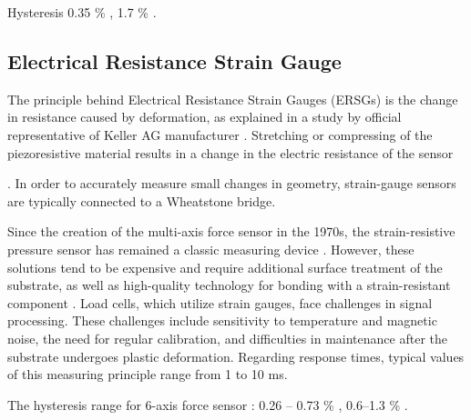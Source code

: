 Hysteresis 0.35 \% \cite{pressure_capac_hysteresis}, 1.7 \% \cite{pressure_capac_hysteresis_2}.

\subsection{Electrical Resistance Strain Gauge}
The principle behind Electrical Resistance Strain Gauges (ERSGs) is the change in resistance caused 
by deformation, as explained in a study by official representative of Keller AG manufacturer \cite{keller_article}. 
Stretching or compressing of the piezoresistive material results in a change in the electric resistance of the sensor 

\cite{multi_axis_force_sensors_review}. 
In order to accurately measure small changes in geometry, 
strain-gauge sensors are typically connected to a Wheatstone bridge.

Since the creation of the multi-axis force sensor in the 1970s, 
the strain-resistive pressure sensor has remained a classic measuring device \cite{3d_FBG_sensor}. 
However, these solutions tend to be expensive and require additional surface treatment of the substrate, 
as well as high-quality technology for bonding with a strain-resistant component 
\cite{my_love_pressure_photosensor, fingertip_based_FBG}. Load cells, which utilize strain gauges, 
face challenges in signal processing. These challenges include sensitivity to temperature and magnetic noise, 
the need for regular calibration, and difficulties in maintenance after the substrate undergoes plastic deformation.
Regarding response times, typical values of this measuring principle range from 1 to 10 ms. \cite{pressure_sens_calibration_stat_dyn}

The hysteresis range for 6-axis force sensor : 0.26 – 0.73 \% \cite{six_axis_ERSG_hyst1},  0.6–1.3 \% \cite{six_axis_ERSG_hyst2}.



